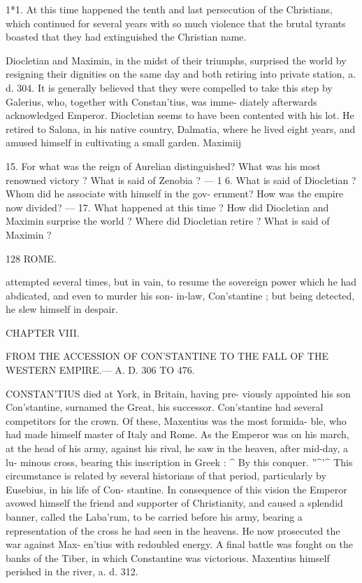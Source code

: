\documentclass[openany,a4paper]{memoir}
\begin{document}
1*1. At this time happened the tenth and last persecution 
of the Christians, which continued for several years with so 
much violence that the brutal tyrants boasted that they had 
extinguished the Christian name. 

Diocletian and Maximin, in the midst of their triumphs, 
surprised the world by resigning their dignities on the same 
day and both retiring into private station, a. d. 304. It is 
generally believed that they were compelled to take this step 
by Galerius, who, together with Constan'tius, was imme- 
diately afterwards acknowledged Emperor. Diocletian seems 
to have been contented with his lot. He retired to Salona, 
in his native country, Dalmatia, where he lived eight years, 
and amused himself in cultivating a small garden. Maximiij 

15. For what was the reign of Aurelian distinguished? What was 
his most renowned victory ? What is said of Zenobia ? — 1 6. What is 
said of Diocletian ? Whom did he associate with himself in the gov- 
ernment? How was the empire now divided? — 17. What happened 
at this time ? How did Diocletian and Maximin surprise the world ? 
Where did Diocletian retire ? What is said of Maximin ? 



128 ROME. 

attempted several times, but in vain, to resume the sovereign 
power which he had abdicated, and even to murder his son- 
in-law, Con'stantine ; but being detected, he slew himself in 
despair. 



CHAPTER VIII. 



FROM THE ACCESSION OF CON'STANTINE TO THE FALL OF 
THE WESTERN EMPIRE.— A. D. 306 TO 476. 

CONSTAN'TIUS died at York, in Britain, having pre- 
viously appointed his son Con'stantine, surnamed the 
Great, his successor. Con'stantine had several competitors 
for the crown. Of these, Maxentius was the most formida- 
ble, who had made himself master of Italy and Rome. As 
the Emperor was on his march, at the head of his army, 
against his rival, he saw in the heaven, after mid-day, a lu- 
minous cross, bearing this inscription in Greek : ^ By this 
conquer. ''^'^ This circumstance is related by several historians 
of that period, particularly by Eusebius, in his life of Con- 
stantine. In consequence of this vision the Emperor avowed 
himself the friend and supporter of Christianity, and caused 
a splendid banner, called the Laba'rum, to be carried before 
his army, bearing a representation of the cross he had seen 
in the heavens. He now prosecuted the war against Max- 
en'tius with redoubled energy. A final battle was fought on 
the banks of the Tiber, in which Constantine was victorious. 
Maxentius himself perished in the river, a. d. 312. 
\end{document}
